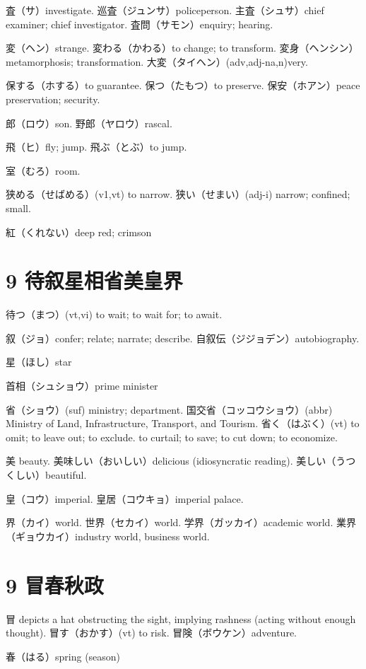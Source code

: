 査（サ）investigate.
巡査（ジュンサ）policeperson.
主査（シュサ）chief examiner; chief investigator.
査問（サモン）enquiry; hearing.

変（ヘン）strange.
変わる（かわる）to change; to transform.
変身（ヘンシン）metamorphosis; transformation.
大変（タイヘン）(adv,adj-na,n)very.

保する（ホする）to guarantee.
保つ（たもつ）to preserve.
保安（ホアン）peace preservation; security.

郎（ロウ）son.
野郎（ヤロウ）rascal.

飛（ヒ）fly; jump.
飛ぶ（とぶ）to jump.

室（むろ）room.

狭める（せばめる）(v1,vt) to narrow.
狭い（せまい）(adj-i) narrow; confined; small.

紅（くれない）deep red; crimson

\section{9 待叙星相省美皇界}

待つ（まつ）(vt,vi) to wait; to wait for; to await.

叙（ジョ）confer; relate; narrate; describe.
自叙伝（ジジョデン）autobiography.

星（ほし）star

首相（シュショウ）prime minister

省（ショウ）(suf) ministry; department.
国交省（コッコウショウ）(abbr)
Ministry of Land, Infrastructure, Transport, and Tourism.
省く（はぶく）(vt)
to omit; to leave out; to exclude.
to curtail; to save; to cut down; to economize.

美 beauty.
美味しい（おいしい）delicious (idiosyncratic reading).
美しい（うつくしい）beautiful.

皇（コウ）imperial.
皇居（コウキョ）imperial palace.

界（カイ）world.
世界（セカイ）world.
学界（ガッカイ）academic world.
業界（ギョウカイ）industry world, business world.

\section{9 冒春秋政}

冒 depicts a hat obstructing the sight, implying rashness
(acting without enough thought).
冒す（おかす）(vt) to risk.
冒険（ボウケン）adventure.

春（はる）spring (season)

